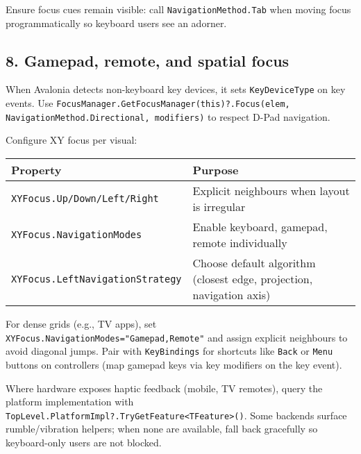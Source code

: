 Ensure focus cues remain visible: call
\passthrough{\lstinline!NavigationMethod.Tab!} when moving focus
programmatically so keyboard users see an adorner.

\subsection{8. Gamepad, remote, and spatial
focus}\label{gamepad-remote-and-spatial-focus}

When Avalonia detects non-keyboard key devices, it sets
\passthrough{\lstinline!KeyDeviceType!} on key events. Use
\passthrough{\lstinline!FocusManager.GetFocusManager(this)?.Focus(elem, NavigationMethod.Directional, modifiers)!}
to respect D-Pad navigation.

Configure XY focus per visual:

\begin{longtable}[]{@{}
  >{\raggedright\arraybackslash}p{}
  >{\raggedright\arraybackslash}p{}@{}}
\toprule\noalign{}
\begin{minipage}[b]{\linewidth}\raggedright
Property
\end{minipage} & \begin{minipage}[b]{\linewidth}\raggedright
Purpose
\end{minipage} \\
\midrule\noalign{}
\endhead
\bottomrule\noalign{}
\endlastfoot
\passthrough{\lstinline!XYFocus.Up/Down/Left/Right!} & Explicit
neighbours when layout is irregular \\
\passthrough{\lstinline!XYFocus.NavigationModes!} & Enable keyboard,
gamepad, remote individually \\
\passthrough{\lstinline!XYFocus.LeftNavigationStrategy!} & Choose
default algorithm (closest edge, projection, navigation axis) \\
\end{longtable}

For dense grids (e.g., TV apps), set
\passthrough{\lstinline!XYFocus.NavigationModes="Gamepad,Remote"!} and
assign explicit neighbours to avoid diagonal jumps. Pair with
\passthrough{\lstinline!KeyBindings!} for shortcuts like
\passthrough{\lstinline!Back!} or \passthrough{\lstinline!Menu!} buttons
on controllers (map gamepad keys via key modifiers on the key event).

Where hardware exposes haptic feedback (mobile, TV remotes), query the
platform implementation with
\passthrough{\lstinline!TopLevel.PlatformImpl?.TryGetFeature<TFeature>()!}.
Some backends surface rumble/vibration helpers; when none are available,
fall back gracefully so keyboard-only users are not blocked.

